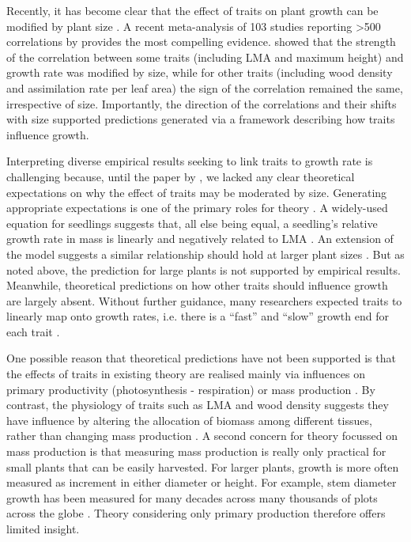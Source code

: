 \documentclass[a4paper,11pt]{article}
\begin{document}
Recently, it has become clear that the effect of traits on plant growth can be modified by plant size \citep{Falster-2011, Ruger-2012, Iida-2014, Visser-2016, Gibert-2016}. A recent meta-analysis of 103 studies reporting \textgreater 500 correlations by \citet{Gibert-2016} provides the most compelling evidence. \citet{Gibert-2016} showed that the strength of the correlation between some traits (including LMA and maximum height) and growth rate was modified by size, while for other traits (including wood density and assimilation rate per leaf area) the sign of the correlation remained the same, irrespective of size. Importantly, the direction of the correlations and their shifts with size supported predictions generated via a framework describing how traits influence growth.

Interpreting diverse empirical results seeking to link traits to growth rate is challenging because, until the paper by \citet{Gibert-2016}, we lacked any clear theoretical expectations on why the effect of traits may be moderated by size. Generating appropriate expectations is one of the primary roles for theory \citep{Kokko-2007}. A widely-used equation for seedlings suggests that, all else being equal, a seedling's relative growth rate in mass is linearly and negatively related to LMA \citep{Lambers-1992, Cornelissen-1996, Wright-2000}. An extension of the model suggests a similar relationship should hold at larger plant sizes \citep{Enquist-2007}. But as noted above, the prediction for large plants is not supported by empirical results. Meanwhile, theoretical predictions on how other traits should influence growth are largely absent. Without further guidance, many researchers expected traits to linearly map onto growth rates, i.e. there is a ``fast'' and ``slow'' growth end for each trait \citep[e.g.][]{Grime-1977, Poorter-2008, Chave-2009, Paine-2015}.

One possible reason that theoretical predictions have not been supported is that the effects of traits in existing theory are realised mainly via influences on primary productivity (photosynthesis - respiration) or mass production \citep{Wright-2000,Enquist-2007}. By contrast, the physiology of traits such as LMA and wood density suggests they have influence by altering the allocation of biomass among different tissues, rather than changing mass production \citep{Falster-2011, Duursma-2016, Gibert-2016}. A second concern for theory focussed on mass production is that measuring mass production is really only practical for small plants that can be easily harvested. For larger plants, growth is more often measured as increment in either diameter or height. For example, stem diameter growth has been measured for many decades across many thousands of plots across the globe \citep{Purves-2008, Anderson-2015, Kunstler-2016}. Theory considering only primary production therefore offers limited insight.
\end{document}
